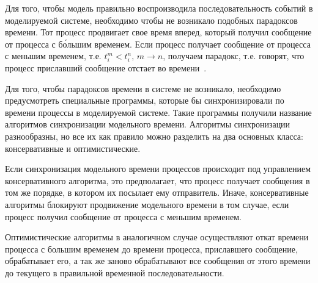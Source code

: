 Для того, чтобы модель правильно воспроизводила последовательность событий в моделируемой системе, необходимо чтобы не возникало подобных парадоксов времени.
Тот процесс продвигает свое время вперед, который получил сообщение от процесса с б\'ольшим временем. Если процесс получает сообщение от процесса с меньшим временем, т.е. $t_i^m<t_i^n, \, m \to n$, получаем парадокс, т.е. говорят, что процесс приславший сообщение  отстает во времени~\cite{okol}.

Для того, чтобы парадоксов времени в системе не возникало, необходимо предусмотреть специальные программы, которые бы синхронизировали по времени процессы в моделируемой системе. Такие программы получили название алгоритмов синхронизации модельного времени. Алгоритмы синхронизации разнообразны, но все их как правило можно разделить на два основных класса: консервативные и оптимистические.

Если синхронизация модельного времени процессов происходит под управлением консервативного алгоритма, это предполагает, что процесс получает сообщения в том же порядке, в котором их посылает ему отправитель.
Иначе, консервативные алгоритмы блокируют продвижение модельного времени в том случае, если процесс получил сообщение от процесса с меньшим временем.

Оптимистические алгоритмы в аналогичном случае осуществляют откат времени процесса с большим временем до времени процесса, приславшего сообщение, обрабатывает его, а так же заново обрабатывают все сообщения от этого времени до текущего в правильной временной последовательности.


